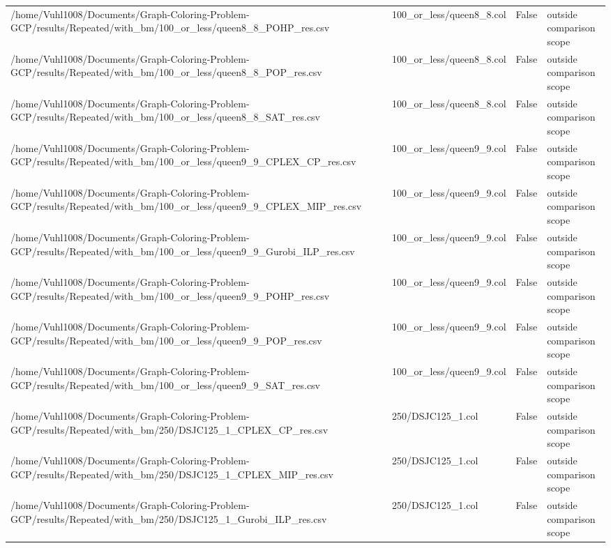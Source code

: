 \begin{table}[htbp]
\begin{tabular}{llll}
/home/Vuhl1008/Documents/Graph-Coloring-Problem-GCP/results/Repeated/with\_bm/100\_or\_less/queen8\_8\_POHP\_res.csv & 100\_or\_less/queen8\_8.col & False & outside comparison scope \\
/home/Vuhl1008/Documents/Graph-Coloring-Problem-GCP/results/Repeated/with\_bm/100\_or\_less/queen8\_8\_POP\_res.csv & 100\_or\_less/queen8\_8.col & False & outside comparison scope \\
/home/Vuhl1008/Documents/Graph-Coloring-Problem-GCP/results/Repeated/with\_bm/100\_or\_less/queen8\_8\_SAT\_res.csv & 100\_or\_less/queen8\_8.col & False & outside comparison scope \\
/home/Vuhl1008/Documents/Graph-Coloring-Problem-GCP/results/Repeated/with\_bm/100\_or\_less/queen9\_9\_CPLEX\_CP\_res.csv & 100\_or\_less/queen9\_9.col & False & outside comparison scope \\
/home/Vuhl1008/Documents/Graph-Coloring-Problem-GCP/results/Repeated/with\_bm/100\_or\_less/queen9\_9\_CPLEX\_MIP\_res.csv & 100\_or\_less/queen9\_9.col & False & outside comparison scope \\
/home/Vuhl1008/Documents/Graph-Coloring-Problem-GCP/results/Repeated/with\_bm/100\_or\_less/queen9\_9\_Gurobi\_ILP\_res.csv & 100\_or\_less/queen9\_9.col & False & outside comparison scope \\
/home/Vuhl1008/Documents/Graph-Coloring-Problem-GCP/results/Repeated/with\_bm/100\_or\_less/queen9\_9\_POHP\_res.csv & 100\_or\_less/queen9\_9.col & False & outside comparison scope \\
/home/Vuhl1008/Documents/Graph-Coloring-Problem-GCP/results/Repeated/with\_bm/100\_or\_less/queen9\_9\_POP\_res.csv & 100\_or\_less/queen9\_9.col & False & outside comparison scope \\
/home/Vuhl1008/Documents/Graph-Coloring-Problem-GCP/results/Repeated/with\_bm/100\_or\_less/queen9\_9\_SAT\_res.csv & 100\_or\_less/queen9\_9.col & False & outside comparison scope \\
/home/Vuhl1008/Documents/Graph-Coloring-Problem-GCP/results/Repeated/with\_bm/250/DSJC125\_1\_CPLEX\_CP\_res.csv & 250/DSJC125\_1.col & False & outside comparison scope \\
/home/Vuhl1008/Documents/Graph-Coloring-Problem-GCP/results/Repeated/with\_bm/250/DSJC125\_1\_CPLEX\_MIP\_res.csv & 250/DSJC125\_1.col & False & outside comparison scope \\
/home/Vuhl1008/Documents/Graph-Coloring-Problem-GCP/results/Repeated/with\_bm/250/DSJC125\_1\_Gurobi\_ILP\_res.csv & 250/DSJC125\_1.col & False & outside comparison scope \\

\end{tabular}
\end{table}
